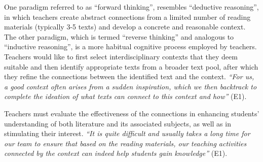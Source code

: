 


One paradigm referred to as ``forward thinking'', resembles ``deductive reasoning'', in which
teachers create abstract connections from a limited number of reading materials (typically 3-5 texts) and develop a concrete and reasonable context. 
The other paradigm, which is termed ``reverse thinking'' and analogous to ``inductive reasoning'', is a more habitual cognitive process employed by teachers. 
Teachers would like to first select interdisciplinary contexts that they deem suitable and then identify appropriate texts from a broader text pool, after which they refine the connections between the identified text and the context. 
\textit{``For us, a good context often arises from a sudden inspiration, which we then backtrack to complete the ideation of what texts can connect to this context and how''} (E1).

Teachers must evaluate the effectiveness of the connections in enhancing students' understanding of both literature and its associated subjects, as well as in stimulating their interest. 
\textit{``It is quite difficult and usually takes a long time for our team to ensure that based on the reading materials, our teaching activities connected by the context can indeed help students gain knowledge''} (E1).

